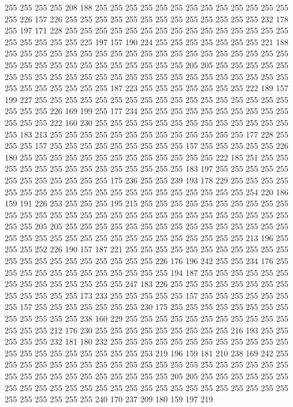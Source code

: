 255 255 255 255 208 188 255 255 255 255 255 255 255 255 255 255 255 255 255 255
226 157 226 255 255 255 255 255 255 255 255 255 255 255 255 255 232 178 255 197
171 228 255 255 255 255 255 255 255 255 255 255 255 255 255 255 255 255 255 255
255 255 225 197 157 190 224 255 255 255 255 255 255 255 221 188 255 255 255 255
255 255 255 255 255 255 255 255 255 255 255 255 255 255 255 255 255 255 255 255
255 255 255 255 255 255 255 205 205 255 255 255 255 255 255 255 255 255 255 255
255 255 255 255 255 255 255 255 255 255 255 255 255 255 255 255 255 255 255 255
187 223 255 255 255 255 255 255 255 222 189 157 199 227 255 255 255 255 255 255
255 255 255 255 255 255 255 255 255 255 255 255 255 255 226 169 199 255 177 234
255 255 255 255 255 255 255 255 255 255 255 255 255 222 160 230 255 255 255 255
255 255 255 255 255 255 255 255 255 255 183 213 255 255 255 255 255 255 255 255
255 255 255 255 255 177 228 255 255 255 157 255 255 255 255 255 255 255 255 255
157 255 255 255 255 255 226 180 255 255 255 255 255 255 255 255 255 255 255 255
255 222 185 251 255 255 255 255 255 255 255 255 255 255 255 255 255 255 183 197
255 255 255 255 255 255 255 255 255 255 255 255 175 236 255 255 239 193 178 229
255 255 255 255 255 255 255 255 255 255 255 255 255 255 255 255 255 255 255 255
254 220 186 159 191 226 253 255 255 255 195 215 255 255 255 255 255 255 255 255
255 255 255 255 255 255 255 255 255 255 255 255 255 255 255 255 255 255 255 255
255 255 255 205 205 255 255 255 255 255 255 255 255 255 255 255 255 255 255 255
255 255 255 255 255 255 255 255 255 255 255 255 255 255 255 255 213 196 255 255
255 252 226 190 157 187 221 255 255 255 255 255 255 255 255 255 255 255 255 255
255 255 255 255 255 255 255 255 226 176 196 242 255 255 234 176 255 255 255 255
255 255 255 255 255 255 255 255 194 187 255 255 255 255 255 255 255 255 255 255
255 255 255 255 247 183 226 255 255 255 255 255 255 255 255 255 255 255 255 255
173 233 255 255 255 255 255 157 255 255 255 255 255 255 255 157 255 255 255 255
255 255 255 230 175 255 255 255 255 255 255 255 255 255 255 255 255 255 238 160
229 255 255 255 255 255 255 255 255 255 255 255 255 255 255 212 176 230 255 255
255 255 255 255 255 255 255 216 193 255 255 255 255 255 232 181 180 232 255 255
255 255 255 255 255 255 255 255 255 255 255 255 255 255 255 255 255 255 255 253
219 196 159 181 210 238 169 242 255 255 255 255 255 255 255 255 255 255 255 255
255 255 255 255 255 255 255 255 255 255 255 255 255 255 255 255 255 255 255 205
205 255 255 255 255 255 255 255 255 255 255 255 255 255 255 255 255 255 255 255
255 255 255 255 255 255 255 255 255 255 255 255 240 170 237 209 180 159 197 219

